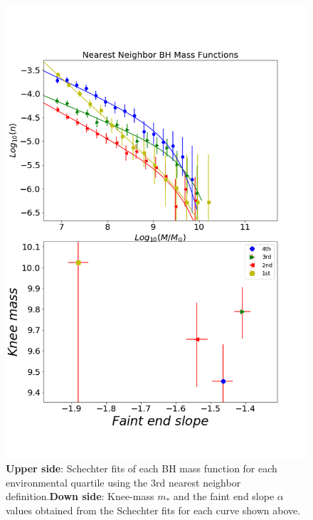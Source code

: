 \documentclass[a4paper,fleqn,usenatbib]{mnras}
\begin{document}
\begin{figure}
	\includegraphics[width=\columnwidth]{./pics/quartilesBH.png}
    \caption{\textbf{Upper side}: Schechter fits of each BH mass
      function for each environmental quartile using the 3rd nearest
      neighbor definition.\textbf{Down side}: Knee-mass $m_\ast$ and
      the faint end slope $\alpha$ values obtained from the Schechter
      fits for each curve shown above.} 
    \label{fig:quartilesBH}
\end{figure}
\end{document}
